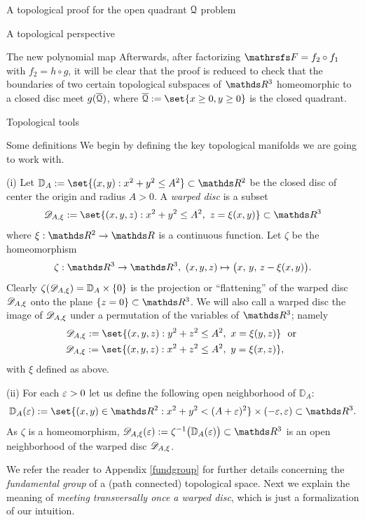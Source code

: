 \documentclass[11pt, a4paper, english, twoside, notitlepage, openright]{report}
\begin{document}
\begin{chapter}{A topological proof for the open quadrant $\mathcal{Q}$ problem}
\begin{section}{A topological perspective}
\begin{subsection}{The new polynomial map}
Afterwards, after factorizing $\FFF=f_2\circ f_1$ with $f_2=h\circ g$, it will be clear that the proof is reduced to check that the boundaries of two certain topological subspaces of $\R^3$ homeomorphic to a closed disc meet $g(\overline{\mathcal{Q}})$, where $\overline{\Qu}:=\set{x\ge 0,y\ge 0}$ is the closed quadrant.
\end{subsection}
\end{section}
\begin{section}{Topological tools}\label{TTT}
\begin{subsection}{Some definitions}\label{topDefs}
We begin by defining the key topological manifolds we are going to work with.
\begin{definitions}
(i) Let ${\mathbb D}_A:=\set{(x,y):x^2+y^2\le A^2}\subset\R^2$ be the closed disc of center the origin and radius $A>0$. A \textit{warped disc} is a subset 
$$
\D_{A,\xi}:=\set{(x,y,z):x^2+y^2\le A^2,\ z=\xi(x,y)}\subset\R^3$$
where $\xi:\R^2\to\R$ is a continuous function. Let $\zeta$ be the homeomorphism
$$
\zeta:\R^3\to\R^3,\ (x,y,z)\mapsto\big(x,\,y,\,z-\xi(x,y)\big).
$$
Clearly $\zeta(\mathscr{D}_{A,\xi})={\mathbb D}_A\times\{0\}$ is the projection or ``flattening'' of the warped disc $\mathscr{D}_{A,\xi}$ onto the plane $\{z=0\}\subset\R^3$. We will also call a warped disc the image of $\mathscr{D}_{A,\xi}$ under a permutation of the variables of $\R^3$; namely
\begin{equation*}
\begin{aligned}
\D_{A,\xi}:=\set{(x,y,z): y^2+z^2\le A^2,\ x=\xi(y,z)}& \ \text{ or } \\
\D_{A,\xi}:=\set{(x,y,z): x^2+z^2\le A^2,\ y=\xi(x,z)}&,
\end{aligned}
\end{equation*}
with $\xi$ defined as above.

\vspace{1mm}

(ii) For each $\varepsilon>0$ let us define the following open neighborhood of ${\mathbb D}_A$: 
$$
{\mathbb D}_A(\eps):=\set{(x,y)\in\R^2:x^2+y^2<(A+\eps)^2}\times(-\eps,\eps)\subset\R^3.
$$ 
As $\zeta$ is a homeomorphism, $\D_{A,\xi}(\eps):=\zeta^{-1}\big({\mathbb D}_A(\eps)\big)\subset\R^3$ is an open neighborhood of the warped disc $\mathscr{D}_{A,\xi}$. 
\end{definitions}

\vspace{1mm}

We refer the reader to Appendix \ref{fundgroup} for further details concerning the \emph{fundamental group} of a (path connected) topological space. Next we explain the meaning of \emph{meeting transversally once a warped disc}, which is just a formalization of our intuition.


\end{subsection}
\end{section}
\end{chapter}
\end{document}
